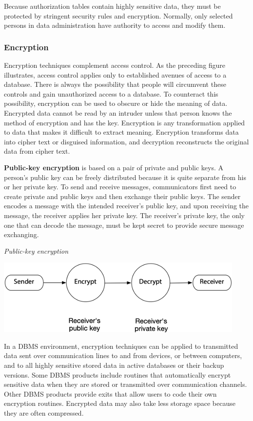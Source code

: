 \documentclass[
]{article}
\begin{document}
Because authorization tables contain highly sensitive data, they must be
protected by stringent security rules and encryption. Normally, only
selected persons in data administration have authority to access and
modify them.

\hypertarget{encryption}{%
\subsubsection*{Encryption}\label{encryption}}

Encryption techniques complement access control. As the preceding figure
illustrates, access control applies only to established avenues of
access to a database. There is always the possibility that people will
circumvent these controls and gain unauthorized access to a database. To
counteract this possibility, encryption can be used to obscure or hide
the meaning of data. Encrypted data cannot be read by an intruder unless
that person knows the method of encryption and has the key. Encryption
is any transformation applied to data that makes it difficult to extract
meaning. Encryption transforms data into cipher text or disguised
information, and decryption reconstructs the original data from cipher
text.

\textbf{Public-key encryption} is based on a pair of private and public keys.
A person's public key can be freely distributed because it is quite
separate from his or her private key. To send and receive messages,
communicators first need to create private and public keys and then
exchange their public keys. The sender encodes a message with the
intended receiver's public key, and upon receiving the message, the
receiver applies her private key. The receiver's private key, the only
one that can decode the message, must be kept secret to provide secure
message exchanging.

\emph{Public-key encryption}

\includegraphics{Figures/Chapter 23/public-key.png}

In a DBMS environment, encryption techniques can be applied to
transmitted data sent over communication lines to and from devices, or
between computers, and to all highly sensitive stored data in active
databases or their backup versions. Some DBMS products include routines
that automatically encrypt sensitive data when they are stored or
transmitted over communication channels. Other DBMS products provide
exits that allow users to code their own encryption routines. Encrypted
data may also take less storage space because they are often compressed.
\end{document}
